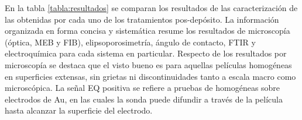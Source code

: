 	 		En la tabla \ref{tabla:resultados} se comparan los resultados de las caracterización de las \pdm\space obtenidas por cada uno de los tratamientos pos-depósito. La información organizada en forma concisa y sistemática resume los resultados de microscopía (óptica, MEB y FIB), elipsoporosimetría, ángulo de contacto, FTIR y electroquímica para cada sistema en particular. Respecto de los resultados por microscopía se destaca que el visto bueno es para aquellas películas homogéneas en superficies extensas, sin grietas ni discontinuidades tanto a escala macro como microscópica. La señal EQ positiva se refiere a pruebas de \pdm\space homogéneas sobre electrodos de Au, en las cuales la sonda puede difundir a través de la película hasta alcanzar la superficie del electrodo.


	 
